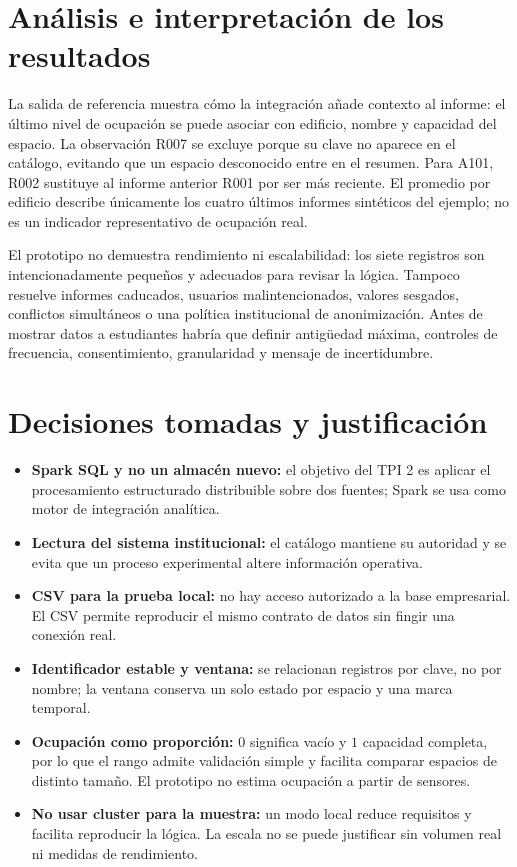 \documentclass[a4paper,12pt]{article}
\begin{document}
\section{Análisis e interpretación de los resultados}
La salida de referencia muestra cómo la integración añade contexto al informe: el último nivel de ocupación se puede asociar con edificio, nombre y capacidad del espacio. La observación R007 se excluye porque su clave no aparece en el catálogo, evitando que un espacio desconocido entre en el resumen. Para A101, R002 sustituye al informe anterior R001 por ser más reciente. El promedio por edificio describe únicamente los cuatro últimos informes sintéticos del ejemplo; no es un indicador representativo de ocupación real.

El prototipo no demuestra rendimiento ni escalabilidad: los siete registros son intencionadamente pequeños y adecuados para revisar la lógica. Tampoco resuelve informes caducados, usuarios malintencionados, valores sesgados, conflictos simultáneos o una política institucional de anonimización. Antes de mostrar datos a estudiantes habría que definir antigüedad máxima, controles de frecuencia, consentimiento, granularidad y mensaje de incertidumbre.

\section{Decisiones tomadas y justificación}
\begin{itemize}[leftmargin=1.2cm]
  \item \textbf{Spark SQL y no un almacén nuevo:} el objetivo del TPI 2 es aplicar el procesamiento estructurado distribuible sobre dos fuentes; Spark se usa como motor de integración analítica.
  \item \textbf{Lectura del sistema institucional:} el catálogo mantiene su autoridad y se evita que un proceso experimental altere información operativa.
  \item \textbf{CSV para la prueba local:} no hay acceso autorizado a la base empresarial. El CSV permite reproducir el mismo contrato de datos sin fingir una conexión real.
  \item \textbf{Identificador estable y ventana:} se relacionan registros por clave, no por nombre; la ventana conserva un solo estado por espacio y una marca temporal.
  \item \textbf{Ocupación como proporción:} $0$ significa vacío y $1$ capacidad completa, por lo que el rango admite validación simple y facilita comparar espacios de distinto tamaño. El prototipo no estima ocupación a partir de sensores.
  \item \textbf{No usar cluster para la muestra:} un modo local reduce requisitos y facilita reproducir la lógica. La escala no se puede justificar sin volumen real ni medidas de rendimiento.
\end{itemize}
\end{document}
